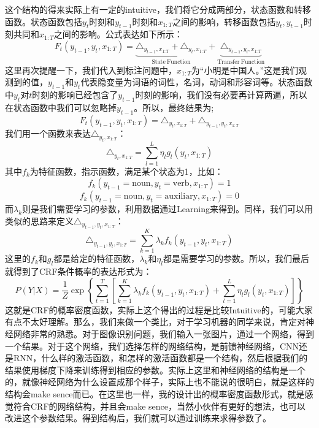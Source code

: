 \documentclass[a4paper]{article}
\begin{document}
这个结构的得来实际上有一定的intuitive，我们将它分成两部分，状态函数和转移函数。状态函数包括$y_t$时刻和$y_{t-1}$时刻和$x_{1:T}$之间的影响，转移函数包括$y_t,y_{t-1}$时刻共同和$x_{1:T}$之间的影响。公式表达如下所示：
\begin{equation}
    F_t(y_{t-1},y_t,x_{1:T}) = \underbrace{\triangle_{y_{t-1},x_{1:T}}+ \triangle_{y_{t},x_{1:T}}}_{\mathrm{State\ Function}} + \underbrace{ \triangle_{y_{t-1},y_t,x_{1:T}}}_{\mathrm{Transfer\ Function}}
\end{equation}
这里再次提醒一下，我们代入到标注问题中，$x_{1:T}$为“小明是中国人。”这是我们观测到的值，$y_{t-1}$和$y_t$代表隐变量为词语的词性，名词，动词和形容词等。状态函数中$y_t$对$t$时刻的影响已经包含了$y_{t-1}$时刻的影响，我们没有必要再计算两遍，所以在状态函数中我们可以忽略掉$y_{t-1}$。所以，最终结果为;
\begin{equation}
    F_t(y_{t-1},y_t,x_{1:T}) = \triangle_{y_{t},x_{1:T}} + \triangle_{y_{t-1},y_t,x_{1:T}}
\end{equation}
我们用一个函数来表达$\triangle_{y_{t},x_{1:T}}$：
\begin{equation}
    \triangle_{y_{t},x_{1:T}} = \sum_{l=1}^L \eta_l g_l(y_t,x_{1:T})
\end{equation}
其中$f_k$为特征函数，指示函数，满足某个状态为1，比如：
$$
f_k(y_{t-1}=\mathrm{noun},y_t=\mathrm{verb},x_{1:T})=1
$$
$$
f_k(y_{t-1}=\mathrm{noun},y_t=\mathrm{auxiliary},x_{1:T})=0
$$
而$\lambda_k$则是我们需要学习的参数，利用数据通过Learning来得到。同样，我们可以用类似的思路来定义$\triangle_{y_{t-1},y_t,x_{1:T}}$：
$$
\triangle_{y_{t-1},y_t,x_{1:T}} = \sum_{k=1}^K \lambda_k f_k(y_{t-1},y_t,x_{1:T})
$$
这里的$f_k$和$g_l$都是给定的特征函数，$\lambda_k$和$\eta_l$都是需要学习的参数。所以，我们最后就得到了CRF条件概率的表达形式为：
\begin{equation}
    P(Y|X) = \frac{1}{Z} \exp \left\{ \sum_{t=1}^T \left[ \sum_{k=1}^K \lambda_k f_k(y_{t-1},y_t,x_{1:T}) + \sum_{l=1}^L \eta_l g_l(y_t,x_{1:T}) \right] \right\}
\end{equation}
这就是CRF的概率密度函数，实际上这个得出的过程是比较Intuitive的，可能大家有点不太好理解。那么，我们来做一个类比，对于学习机器的同学来说，肯定对神经网络非常的熟悉。对于图像识别问题，我们输入一张图片，通过一个网络，得到一个结果。对于这个网络，我们选择怎样的网络结构，是前馈神经网络，CNN还是RNN，什么样的激活函数，和怎样的激活函数都是一个结构，然后根据我们的结果使用梯度下降来训练得到相应的参数。实际上这里和神经网络的结构是一个的，就像神经网络为什么设置成那个样子，实际上也不能说的很明白，就是这样的结构会make sence而已。在这里也一样，我的设计出的概率密度函数形式，就是感觉符合CRF的网络结构，并且会make sence，当然小伙伴有更好的想法，也可以改进这个参数结果。得到结构后，我们就可以通过训练来求得参数了。
\end{document}
